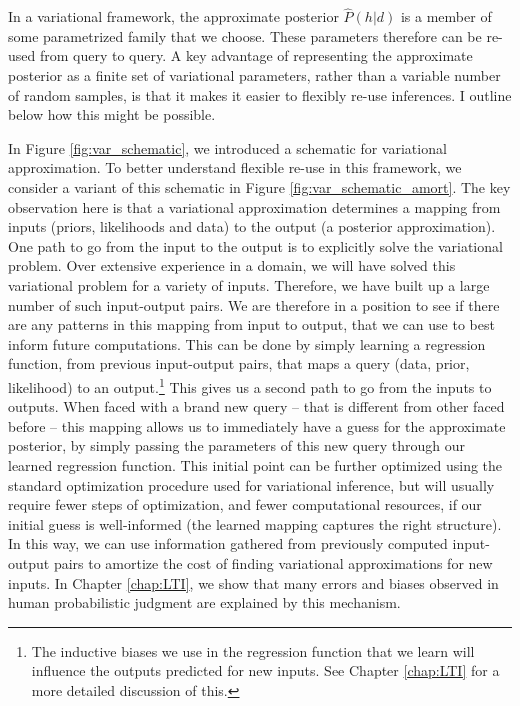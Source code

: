 In a variational framework, the approximate posterior $\hat{P}(h | d)$ is a member of some parametrized family that we choose. These parameters therefore can be re-used from query to query. A key advantage of representing the approximate posterior as a finite set of variational parameters, rather than a variable number of random samples, is that it makes it easier to flexibly re-use inferences. I outline below how this might be possible.

In Figure \ref{fig:var_schematic}, we introduced a schematic for variational approximation. To better understand flexible re-use in this framework, we consider a variant of this schematic in Figure \ref{fig:var_schematic_amort}. The key observation here is that a variational approximation determines a mapping from inputs (priors, likelihoods and data) to the output (a posterior approximation). One path to go from the input to the output is to explicitly solve the variational problem. Over extensive experience in a domain, we will have solved this variational problem for a variety of inputs. Therefore, we have built up a large number of such input-output pairs. We are therefore in a position to see if there are any patterns in this mapping from input to output, that we can use to best inform future computations. This can be done by simply learning a regression function, from previous input-output pairs, that maps a query (data, prior, likelihood) to an output.\footnote{The inductive biases we use in the regression function that we learn will influence the outputs predicted for new inputs. See Chapter \ref{chap:LTI} for a more detailed discussion of this.} This gives us a second path to go from the inputs to outputs. When faced with a brand new query -- that is different from other faced before -- this mapping allows us to immediately have a guess for the approximate posterior, by simply passing the parameters of this new query through our learned regression function. This initial point can be further optimized using the standard optimization procedure used for variational inference, but will usually require fewer steps of optimization, and fewer computational resources, if our initial guess is well-informed (the learned mapping captures the right structure). In this way, we can use information gathered from previously computed input-output pairs to amortize the cost of finding variational approximations for new inputs. In Chapter \ref{chap:LTI}, we show that many errors and biases observed in human probabilistic judgment are explained by this mechanism.

